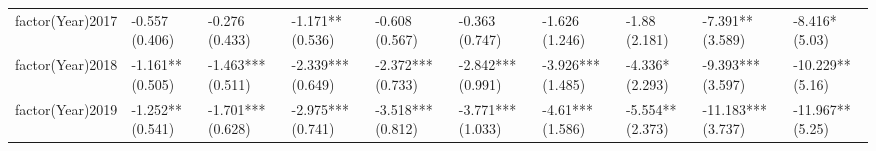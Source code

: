 \begin{table}[ht]
\begin{tabular}{llllllllll}
  factor(Year)2017 & -0.557 (0.406) & -0.276 (0.433) & -1.171** (0.536) & -0.608 (0.567) & -0.363 (0.747) & -1.626 (1.246) & -1.88 (2.181) & -7.391** (3.589) & -8.416* (5.03) \\ 
  factor(Year)2018 & -1.161** (0.505) & -1.463*** (0.511) & -2.339*** (0.649) & -2.372*** (0.733) & -2.842*** (0.991) & -3.926*** (1.485) & -4.336* (2.293) & -9.393*** (3.597) & -10.229** (5.16) \\ 
  factor(Year)2019 & -1.252** (0.541) & -1.701*** (0.628) & -2.975*** (0.741) & -3.518*** (0.812) & -3.771*** (1.033) & -4.61*** (1.586) & -5.554** (2.373) & -11.183*** (3.737) & -11.967** (5.25) \\ 
   \bottomrule
\end{tabular}
\endgroup
\end{table}
